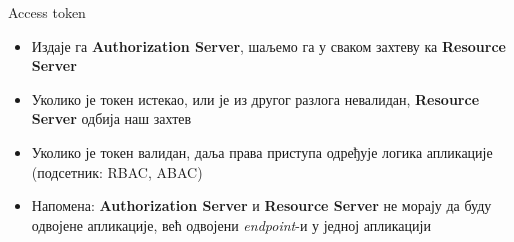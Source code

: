 \documentclass{beamer}
\begin{document}
    \begin{frame}{Access token}
        \begin{itemize}
            \item Издаје га \textbf{Authorization Server}, шаљемо га у сваком захтеву ка \textbf{Resource Server}
            \item Уколико је токен истекао, или је из другог разлога невалидан, \textbf{Resource Server} одбија наш захтев
            \item Уколико је токен валидан, даља права приступа одређује логика апликације (подсетник: RBAC, ABAC)
            \item Напомена: \textbf{Authorization Server} и \textbf{Resource Server} не морају да буду одвојене апликације, већ одвојени \textit{endpoint}-и у једној апликацији
        \end{itemize}
    \end{frame}
    
\end{document}
